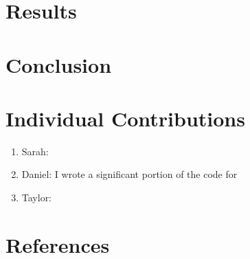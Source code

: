\documentclass[11pt]{article}
\begin{document}
\section{Results}



\section{Conclusion}



\section{Individual Contributions}

\begin{enumerate}
\item Sarah:

\item Daniel: I wrote a significant portion of the code for 

\item Taylor:
\end{enumerate}

\section{References}
\end{document}
